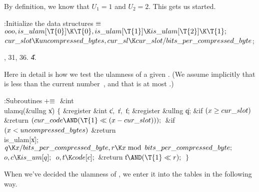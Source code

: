 By definition, we know that $U_1=1$ and $U_2=2$. This gets us started.

\Y\B\4:Initialize the data structures\X${}\equiv{}$\6
$\\{ooo},\39\\{is\_ulam}[\T{0}]\K\T{0},\39\\{is\_ulam}[\T{1}]\K\\{is\_ulam}[%
\T{2}]\K\T{1};{}$\6
${}\\{cur\_slot}\K\\{uncompressed\_bytes},\39\\{cur\_sl}\K\\{cur\_slot}/\\{bits%
\_per\_compressed\_byte}{}$;\par
{}, 31, 36.
\U4.\fi

Here in detail is how we test the ulamness of a given . (We
assume
implicitly that  is less than the current number~, and that
 is at most .)

\Y\B\4:Subroutines\X${}\mathrel+\equiv{}$\6
\&{int} \\{ulamq}(\&{ullng} \|x)\5
${}\{{}$\1\6
\&{register} \&{int} \|c${},{}$ \|r${},{}$ \|t;\6
\&{register} \&{ullng} \|q;\7
\&{if} ${}(\|x\G\\{cur\_slot}){}$\1\5
\&{return} ${}(\\{cur\_code}\AND(\T{1}\LL(\|x-\\{cur\_slot})));{}$\2\6
\&{if} ${}(\|x<\\{uncompressed\_bytes}){}$\1\5
\&{return} \\{is\_ulam}[\|x];\2\6
${}\|q\K\|x/\\{bits\_per\_compressed\_byte},\39\|r\K\|x\mod\\{bits\_per%
\_compressed\_byte};{}$\6
${}\|o,\39\|c\K\\{is\_um}[\|q];{}$\6
${}\|o,\39\|t\K\\{code}[\|c];{}$\6
\&{return} \|t${}\AND(\T{1}\LL\|r);{}$\6
\4${}\}{}$\2\par
\fi

When we've decided the ulamness of , we enter it into the
tables in the following way.


